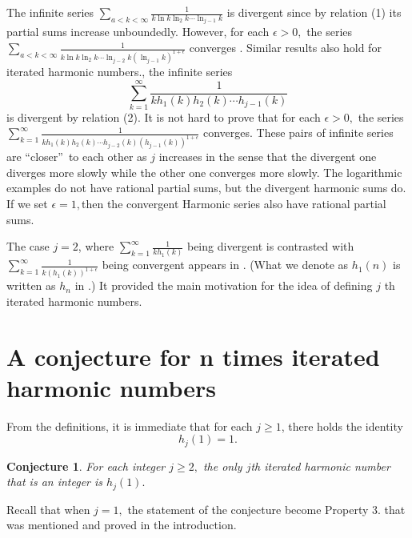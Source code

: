 \documentclass{article}
\newtheorem{conjecture}[theorem]{Conjecture}
\begin{document}
The infinite series $\sum_{a<k<\infty }\frac{1}{k\ln k\ln _{2}k\cdots \ln
_{j-1}k}$ is divergent since by relation (1) its partial sums increase
unboundedly. However, for each $\epsilon >0,$ the series $\sum_{a<k<\infty }%
\frac{1}{k\ln k\ln _{2}k\cdots \ln _{j-2}k\left( \ln _{j-1}k\right)
^{1+\epsilon }}$ converges \cite{A}. Similar results also hold for iterated
harmonic numbers., the infinite series 
\begin{equation*}
\sum_{k=1}^{\infty }\frac{1}{kh_{1}\left( k\right) h_{2}\left( k\right)
\cdots h_{j-1}\left( k\right) }
\end{equation*}%
is divergent by relation (2). It is not hard to prove that for each $%
\epsilon >0,$ the series $\sum_{k=1}^{\infty }\frac{1}{kh_{1}\left( k\right)
h_{2}\left( k\right) \cdots h_{j-2}\left( k\right) \left( h_{j-1}\left(
k\right) \right) ^{1+\epsilon }}$ converges. These pairs of infinite series
are \textquotedblleft closer\textquotedblright\ to each other as $j$
increases in the sense that the divergent one diverges more slowly while the
other one converges more slowly. The logarithmic examples do not have
rational partial sums, but the divergent harmonic sums do. If we set $%
\epsilon =1,$then the convergent Harmonic series also have rational partial
sums.

The case $j=2$, where $\sum_{k=1}^{\infty }\frac{1}{kh_{1}\left( k\right) }$
being divergent is contrasted with $\sum_{k=1}^{\infty }\frac{1}{k\left(
h_{1}\left( k\right) \right) ^{1+\epsilon }}$ being convergent appears in 
\cite{AP}. (What we denote as $h_{1}\left( n\right) $ is written as $h_{n}$
in \cite{AP}.) It provided the main motivation for the idea of defining $j$%
th iterated harmonic numbers.

\section{A conjecture for n times iterated harmonic numbers}

From the definitions, it is immediate that for each $j\geq 1$, there holds
the identity 
\begin{equation*}
h_{j}\left( 1\right) =1.
\end{equation*}

\begin{conjecture}
For each integer $j\geq 2,$ the only $j$th iterated harmonic number that is
an integer is $h_{j}\left( 1\right) .$
\end{conjecture}

Recall that when $j=1,$ the statement of the conjecture become Property 3.
that was mentioned and proved in the introduction.
\end{document}
